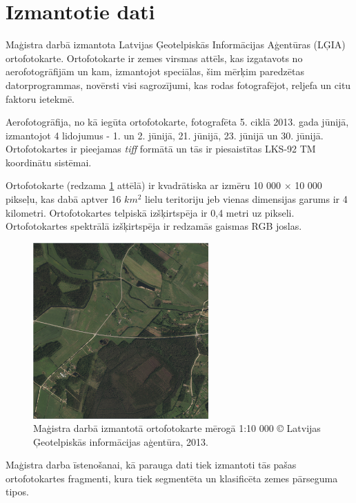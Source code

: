 \documentclass[12pt,paper=a4]{report}
\begin{document}
\section{Izmantotie dati}Maģistra darbā izmantota Latvijas Ģeotelpiskās Informācijas Aģentūras (LĢIA) ortofotokarte. Ortofotokarte ir zemes virsmas attēls, kas izgatavots no aerofotogrāfijām un kam, izmantojot speciālas, šim mērķim paredzētas datorprogrammas, novērsti visi sagrozījumi, kas rodas fotografējot, reljefa un citu faktoru ietekmē. \cite{lgia}\par
Aerofotogrāfija, no kā iegūta ortofotokarte, fotografēta 5. ciklā 2013. gada jūnijā, izmantojot 4 lidojumus - 1. un 2. jūnijā, 21. jūnijā, 23. jūnijā un 30. jūnijā. Ortofotokartes ir pieejamas \textit{tiff} formātā un tās ir piesaistītas LKS-92 TM koordinātu sistēmai. \cite{lgia2}\par 
Ortofotokarte (redzama \ref{fig:fullIm} attēlā) ir kvadrātiska ar izmēru 10 000 $\times$ 10 000 pikseļu, kas dabā aptver 16 $km^2$ lielu teritoriju jeb vienas dimensijas garums ir 4 kilometri. Ortofotokartes telpiskā izšķirtspēja ir 0,4 metri uz pikseli. Ortofotokartes spektrālā izšķirtspēja ir redzamās gaismas RGB joslas. \par
\begin{figure}[h]
\centering
\includegraphics[width=0.6\textwidth]{original.png}
\caption{Maģistra darbā izmantotā ortofotokarte mērogā 1:10 000 © Latvijas Ģeotelpiskās informācijas aģentūra, 2013.}
\label{fig:fullIm}
\end{figure}\par
Maģistra darba īstenošanai, kā parauga dati tiek izmantoti tās pašas ortofotokartes fragmenti, kura tiek segmentēta un klasificēta zemes pārseguma tipos. 
\end{document}
